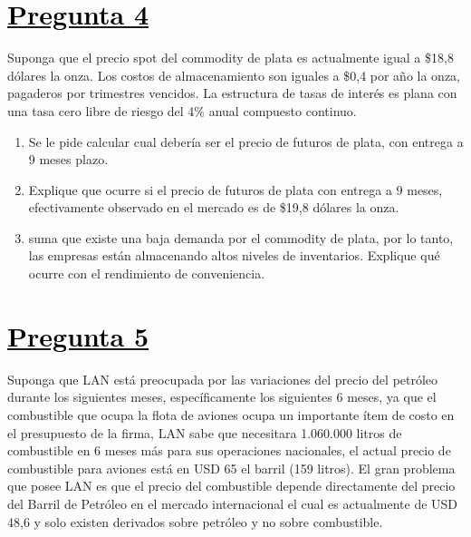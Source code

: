 \documentclass[12pt]{article}
\newcommand{\subrayadoRojo}[1]{{\color{rojoudp}\underline{\textcolor{black}{#1}}}}
\begin{document}
\section*{\subrayadoRojo{Pregunta 4}}
Suponga que el precio spot del commodity de plata es actualmente igual a \$18,8 dólares  
la onza. Los costos de almacenamiento son iguales a \$0,4 por año la onza, pagaderos por
trimestres vencidos. La estructura de tasas de interés es plana con una tasa cero libre 
de riesgo del 4\% anual compuesto continuo.
\begin{enumerate}[label=\textbf{\alph*)}]
    \item   Se le pide calcular cual debería ser el precio de futuros de plata, con entrega a 9 meses plazo.
    \item 	Explique que ocurre si el precio de futuros de plata con entrega a 9 meses,
    efectivamente observado en el mercado es de \$19,8 dólares la onza.
    \item suma que existe una baja demanda por el commodity de plata, por lo tanto,
    las empresas están almacenando altos niveles de inventarios. 
    Explique qué ocurre con el rendimiento de conveniencia.
    
\end{enumerate}

\section*{\subrayadoRojo{Pregunta 5}}
    Suponga que LAN está preocupada por las variaciones del precio del petróleo durante los siguientes meses,
    específicamente los siguientes 6 meses, ya que el combustible que ocupa la flota de aviones ocupa un importante 
    ítem de costo en el presupuesto de la firma, LAN sabe que necesitara 1.060.000 litros de combustible en 6 meses
    más para sus operaciones nacionales, el actual precio de combustible para aviones está en USD 65 el barril (159 litros). 
    El gran problema que posee LAN es que el precio del combustible depende directamente del precio del Barril de Petróleo 
    en el mercado internacional el cual es actualmente de USD 48,6 y solo existen derivados sobre petróleo y no sobre combustible.
\end{document}
